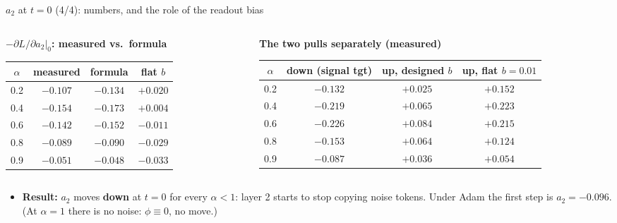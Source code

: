 \documentclass[aspectratio=169,11pt]{beamer}
\newcommand{\1}{\mathbf{1}}
\begin{document}
\begin{frame}{$a_2$ at $t=0$ (4/4): numbers, and the role of the readout bias}
\footnotesize\setlength{\abovedisplayskip}{2pt}\setlength{\belowdisplayskip}{2pt}
\begin{columns}[T]
\begin{column}{0.4\textwidth}
\textbf{$-\partial L/\partial a_2|_0$: measured vs.\ formula}
\begin{center}\scriptsize\renewcommand{\arraystretch}{0.95}
\begin{tabular}{cccc}\toprule
$\alpha$ & measured & formula & flat $b$\\\midrule
0.2 & $-0.107$ & $-0.134$ & $+0.020$\\
0.4 & $-0.154$ & $-0.173$ & $+0.004$\\
0.6 & $-0.142$ & $-0.152$ & $-0.011$\\
0.8 & $-0.089$ & $-0.090$ & $-0.029$\\
0.9 & $-0.051$ & $-0.048$ & $-0.033$\\\bottomrule
\end{tabular}
\end{center}
\end{column}
\begin{column}{0.57\textwidth}
\textbf{The two pulls separately (measured)}
\begin{center}\scriptsize\renewcommand{\arraystretch}{0.95}
\begin{tabular}{cccc}\toprule
$\alpha$ & down (signal tgt) & up, designed $b$ & up, flat $b=0.01$\\\midrule
0.2 & $-0.132$ & $+0.025$ & $+0.152$\\
0.4 & $-0.219$ & $+0.065$ & $+0.223$\\
0.6 & $-0.226$ & $+0.084$ & $+0.215$\\
0.8 & $-0.153$ & $+0.064$ & $+0.124$\\
0.9 & $-0.087$ & $+0.036$ & $+0.054$\\\bottomrule
\end{tabular}
\end{center}
\end{column}
\end{columns}
\vspace{0.1em}
\begin{itemize}
\item \textbf{Result:} $a_2$ moves \textbf{down} at $t=0$ for every $\alpha<1$: layer 2 starts to stop copying noise tokens.
Under Adam the first step is $a_2=-0.096$. (At $\alpha=1$ there is no noise: $\phi\equiv0$, no move.)

\end{itemize}
\end{frame}
\end{document}
